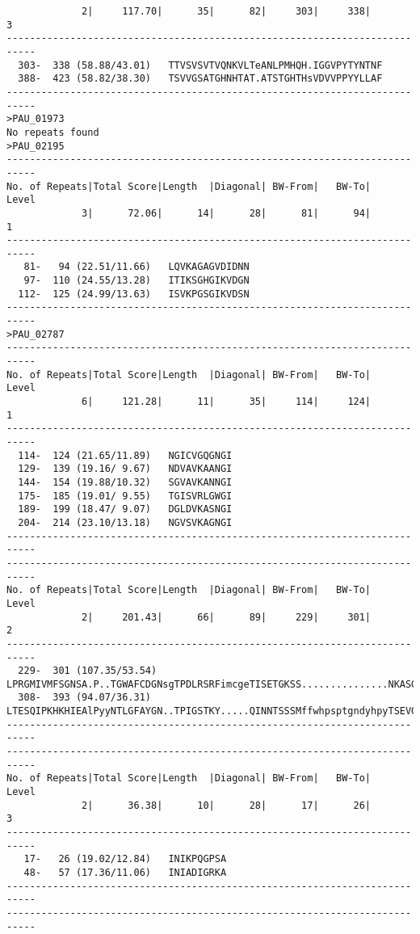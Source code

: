 \begin{verbatim}
             2|     117.70|      35|      82|     303|     338|       3
---------------------------------------------------------------------------
  303-  338 (58.88/43.01)	TTVSVSVTVQNKVLTeANLPMHQH.IGGVPYTYNTNF
  388-  423 (58.82/38.30)	TSVVGSATGHNHTAT.ATSTGHTHsVDVVPPYYLLAF
---------------------------------------------------------------------------
>PAU_01973
No repeats found
>PAU_02195
---------------------------------------------------------------------------
No. of Repeats|Total Score|Length  |Diagonal| BW-From|   BW-To|   Level
             3|      72.06|      14|      28|      81|      94|       1
---------------------------------------------------------------------------
   81-   94 (22.51/11.66)	LQVKAGAGVDIDNN
   97-  110 (24.55/13.28)	ITIKSGHGIKVDGN
  112-  125 (24.99/13.63)	ISVKPGSGIKVDSN
---------------------------------------------------------------------------
>PAU_02787
---------------------------------------------------------------------------
No. of Repeats|Total Score|Length  |Diagonal| BW-From|   BW-To|   Level
             6|     121.28|      11|      35|     114|     124|       1
---------------------------------------------------------------------------
  114-  124 (21.65/11.89)	NGICVGQGNGI
  129-  139 (19.16/ 9.67)	NDVAVKAANGI
  144-  154 (19.88/10.32)	SGVAVKANNGI
  175-  185 (19.01/ 9.55)	TGISVRLGWGI
  189-  199 (18.47/ 9.07)	DGLDVKASNGI
  204-  214 (23.10/13.18)	NGVSVKAGNGI
---------------------------------------------------------------------------
---------------------------------------------------------------------------
No. of Repeats|Total Score|Length  |Diagonal| BW-From|   BW-To|   Level
             2|     201.43|      66|      89|     229|     301|       2
---------------------------------------------------------------------------
  229-  301 (107.35/53.54)	LPRGMIVMFSGNSA.P..TGWAFCDGNsgTPDLRSRFimcgeTISETGKSS...............NKASGSGNGKNF..SRNTTSTTVSVNV
  308-  393 (94.07/36.31)	LTESQIPKHKHIEAlPyyNTLGFAYGN..TPIGSTKY.....QINNTSSSMffwhpsptgndyhpyTSEVGGGQGHNHkaTASSSSHTHSVDV
---------------------------------------------------------------------------
---------------------------------------------------------------------------
No. of Repeats|Total Score|Length  |Diagonal| BW-From|   BW-To|   Level
             2|      36.38|      10|      28|      17|      26|       3
---------------------------------------------------------------------------
   17-   26 (19.02/12.84)	INIKPQGPSA
   48-   57 (17.36/11.06)	INIADIGRKA
---------------------------------------------------------------------------
---------------------------------------------------------------------------

\end{verbatim}
